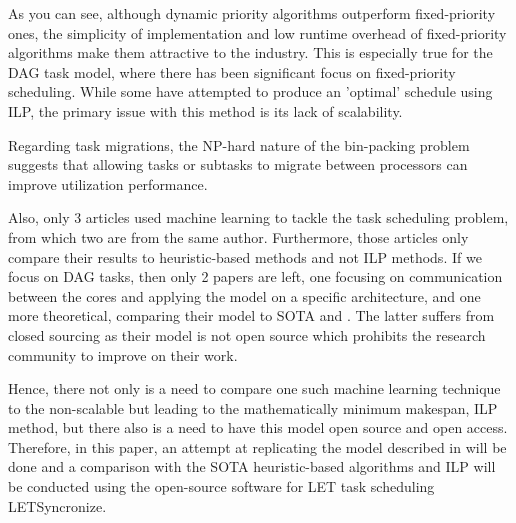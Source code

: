 

As you can see, although dynamic priority algorithms outperform 
fixed-priority ones, the simplicity of implementation and low runtime 
overhead of fixed-priority algorithms make them attractive to the 
industry. This is especially true for the DAG task model, where 
there has been significant focus on fixed-priority scheduling. While 
some have attempted to produce an 'optimal' schedule using 
ILP\cite{wei2011reliabilityILP}\cite{yip2014relaxing}\cite{ChangMinWRCTBoundILP2022}, 
the primary issue with this method is its lack of scalability.

Regarding task migrations, the NP-hard nature of the 
bin-packing problem suggests that allowing tasks or subtasks to migrate 
between processors can improve utilization performance.


Also, only 3 articles used machine learning to tackle the task scheduling problem,
from which two are from the same author.
Furthermore, those articles only compare their results to 
heuristic-based methods and not ILP methods.
If we focus on DAG tasks, then only 2 papers are left,
one focusing on communication between the cores and
applying the model on a specific architecture\cite{yano2021work},
and one more theoretical\cite{lee2021DAGDeeplearning}, comparing their model to SOTA 
\cite{zhao2020dag} and \cite{he2019intra}. The latter suffers 
from closed sourcing as their model is not open source
which prohibits the research community to improve on their work. 

Hence, there not only is a need to compare one such machine learning technique 
to the non-scalable but leading to the mathematically minimum makespan, ILP method,
but there also is a need to have this model open source and open access.
Therefore, in this paper, an attempt at replicating the model described
in \cite{lee2021DAGDeeplearning} will be done and 
a comparison with the SOTA heuristic-based algorithms
and ILP will be conducted using the open-source software 
for LET task scheduling LETSyncronize\cite{yip2023letsynchronise}.
